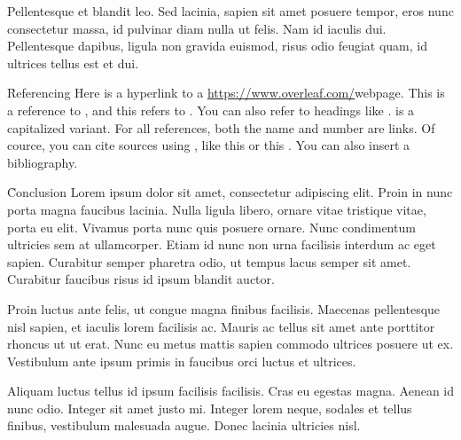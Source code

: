 \documentclass{article}
\begin{document}
Pellentesque et blandit leo. Sed lacinia, sapien sit amet posuere tempor, eros nunc consectetur massa, id pulvinar diam nulla ut felis. Nam id iaculis dui. Pellentesque dapibus, ligula non gravida euismod, risus odio feugiat quam, id ultrices tellus est et dui.

\h{Referencing}
Here is a hyperlink to a \url{https://www.overleaf.com/}{webpage}. This is a reference to , and this refers to . You can also refer to headings like .  is a capitalized variant. For all references, both the name and number are links. Of cource, you can cite sources using \c{\cite{...}}, like this \cite{minted} or this \cite{tabularray}. You can also insert a bibliography.

\h{Conclusion}
Lorem ipsum dolor sit amet, consectetur adipiscing elit. Proin in nunc porta magna faucibus lacinia. Nulla ligula libero, ornare vitae tristique vitae, porta eu elit. Vivamus porta nunc quis posuere ornare. Nunc condimentum ultricies sem at ullamcorper. Etiam id nunc non urna facilisis interdum ac eget sapien. Curabitur semper pharetra odio, ut tempus lacus semper sit amet. Curabitur faucibus risus id ipsum blandit auctor.

Proin luctus ante felis, ut congue magna finibus facilisis. Maecenas pellentesque nisl sapien, et iaculis lorem facilisis ac. Mauris ac tellus sit amet ante porttitor rhoncus ut ut erat. Nunc eu metus mattis sapien commodo ultrices posuere ut ex. Vestibulum ante ipsum primis in faucibus orci luctus et ultrices.

Aliquam luctus tellus id ipsum facilisis facilisis. Cras eu egestas magna. Aenean id nunc odio. Integer sit amet justo mi. Integer lorem neque, sodales et tellus finibus, vestibulum malesuada augue. Donec lacinia ultricies nisl.

\toc

\end{document}
